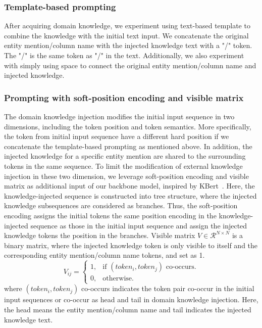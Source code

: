 
\subsubsection{Template-based prompting}
After acquiring domain knowledge, we experiment using text-based template to combine the knowledge with the initial text input. We concatenate the original entity mention/column name with the injected knowledge text with a "/" token. The "/" is the same token as "/" in the text. 
Additionally, we also experiment with simply using space to connect the original entity mention/column name and injected knowledge. 



\subsubsection{Prompting with soft-position encoding and visible matrix}
The domain knowledge injection modifies the initial input sequence in two dimensions, including the token position and token semantics. More specifically, the token from initial input sequence have a different hard position if we concatenate the template-based prompting as mentioned above. In addition, the injected knowledge for a specific entity mention are shared to the surrounding tokens in the same sequence. To limit the modification of external knowledge injection in these two dimension, we leverage soft-position encoding and visible matrix as additional input of our backbone model, inspired by KBert~\cite{liu_k-bert_2020}. Here, the knowledge-injected sequence is constructed into tree structure, where the injected knowledge subsequences are considered as branches. Thus, the soft-position encoding assigns the initial tokens the same position encoding in the knowledge-injected sequence as those in the initial input sequence and assign the injected knowledge tokens the position in the branches. Visible matrix $V\in \mathcal{R}^{N \times N}$ is a binary matrix, where the injected knowledge token is only visible to itself and the corresponding entity mention/column name tokens, and set as 1.
\begin{equation}
    V_{ij} = \begin{cases}
    1, & \text{if $(token_i, token_j)$ co-occurs}.\\
    0, & \text{otherwise}.
  \end{cases}
\end{equation}
where $(token_i, token_j)$ co-occurs indicates the token pair co-occur in the initial input sequences or  co-occur as head and tail in domain knowledge injection. Here, the head means the entity mention/column name and tail indicates the injected knowledge text. 